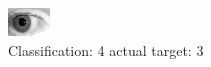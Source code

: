 \begin{figure}[h!]
\begin{center}
\includegraphics[width=0.60\columnwidth]{figures/ID339_class_4_target_3.png}
\end{center}
\caption{ Classification: 4 actual target: 3}
\label{fig:ID339_class_4_target_3}
\end{figure}
